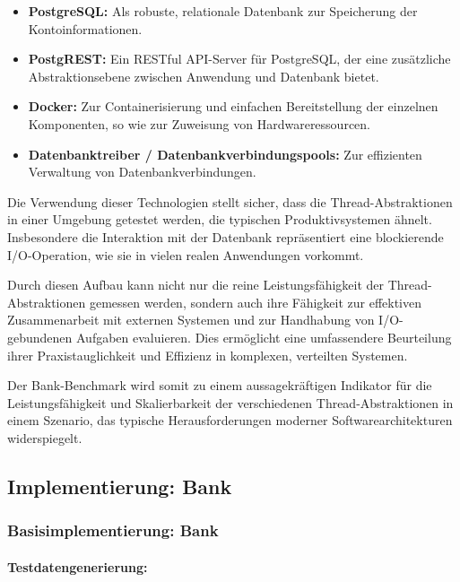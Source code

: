 \documentclass[fontsize=12pt,paper=a4,twoside=semi,parskip=half-,headsepline,headinclude]{scrreprt}
\begin{document}
\begin{itemize}
	\item \textbf{PostgreSQL:} Als robuste, relationale Datenbank zur Speicherung der Kontoinformationen.
	\item \textbf{PostgREST:} Ein RESTful API-Server für PostgreSQL, der eine zusätzliche Abstraktionsebene zwischen Anwendung und Datenbank bietet.
	\item \textbf{Docker:} Zur Containerisierung und einfachen Bereitstellung der einzelnen Komponenten, so wie zur Zuweisung von Hardwareressourcen.
	\item \textbf{Datenbanktreiber / Datenbankverbindungspools:} Zur effizienten Verwaltung von Datenbankverbindungen.
\end{itemize}

Die Verwendung dieser Technologien stellt sicher, dass die Thread-Abs\-trak\-tio\-nen in einer Umgebung getestet werden, die typischen Produktivsystemen ähnelt. Insbesondere die Interaktion mit der Datenbank repräsentiert eine blockierende I/O-Operation, wie sie in vielen realen Anwendungen vorkommt.

Durch diesen Aufbau kann nicht nur die reine Leistungsfähigkeit der Thread-Abs\-trak\-tio\-nen gemessen werden, sondern auch ihre Fähigkeit zur effektiven Zusammenarbeit mit externen Systemen und zur Handhabung von I/O-gebundenen Aufgaben evaluieren. Dies ermöglicht eine umfassendere Beurteilung ihrer Praxistauglichkeit und Effizienz in komplexen, verteilten Systemen.

Der Bank-Benchmark wird somit zu einem aussagekräftigen Indikator für die Leistungsfähigkeit und Skalierbarkeit der verschiedenen Thread-Abstraktionen in einem Szenario, das typische Herausforderungen moderner Softwarearchitekturen widerspiegelt.

\subsection{Implementierung: Bank}

\subsubsection{Basisimplementierung: Bank}

\paragraph{Testdatengenerierung:}
\label{para:datagenerator}
\end{document}
